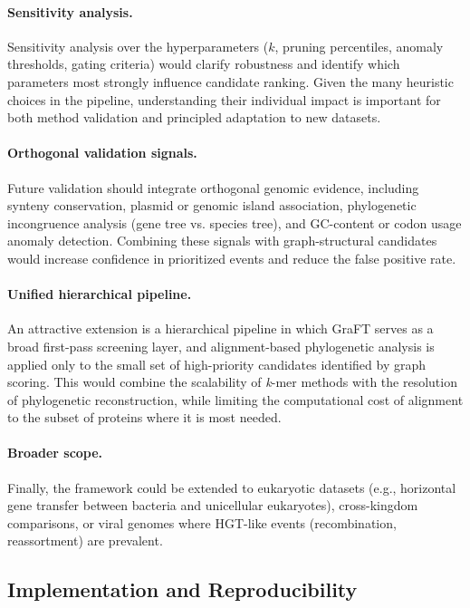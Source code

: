 \documentclass[11pt]{article}
\begin{document}
\paragraph{Sensitivity analysis.} Sensitivity analysis over the hyperparameters ($k$, pruning percentiles, anomaly thresholds, gating criteria) would clarify robustness and identify which parameters most strongly influence candidate ranking. Given the many heuristic choices in the pipeline, understanding their individual impact is important for both method validation and principled adaptation to new datasets.

\paragraph{Orthogonal validation signals.} Future validation should integrate orthogonal genomic evidence, including synteny conservation, plasmid or genomic island association, phylogenetic incongruence analysis (gene tree vs. species tree), and GC-content or codon usage anomaly detection. Combining these signals with graph-structural candidates would increase confidence in prioritized events and reduce the false positive rate.

\paragraph{Unified hierarchical pipeline.} An attractive extension is a hierarchical pipeline in which GraFT serves as a broad first-pass screening layer, and alignment-based phylogenetic analysis is applied only to the small set of high-priority candidates identified by graph scoring. This would combine the scalability of \textit{k}-mer methods with the resolution of phylogenetic reconstruction, while limiting the computational cost of alignment to the subset of proteins where it is most needed.

\paragraph{Broader scope.} Finally, the framework could be extended to eukaryotic datasets (e.g., horizontal gene transfer between bacteria and unicellular eukaryotes\cite{Soucy2015}), cross-kingdom comparisons, or viral genomes where HGT-like events (recombination, reassortment) are prevalent.

\subsection{Implementation and Reproducibility}
\end{document}
